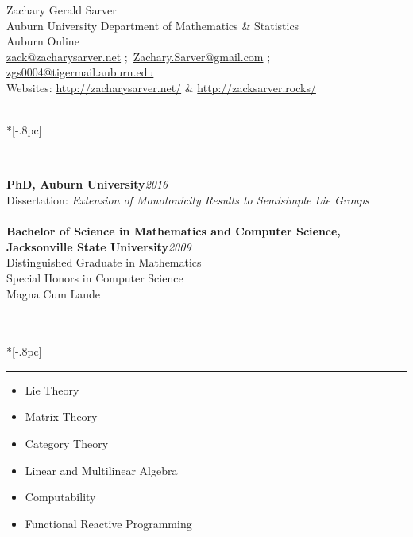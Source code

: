 \documentclass{article}
\begin{document}
\thispagestyle{empty}

\begin{center}
{\Large Zachary Gerald Sarver} \\[.5pc]
Auburn University Department of Mathematics \& Statistics \\
Auburn Online \\
\href{mailto:zack@zacharysarver.net}{zack@zacharysarver.net} $;$
\href{mailto:Zachary.Sarver@gmail.com}{Zachary.Sarver@gmail.com} $;$
\href{mailto:zgs0004@tigermail.auburn.edu}{zgs0004@tigermail.auburn.edu} \\
Websites: \url{http://zacharysarver.net/} \& \url{http://zacksarver.rocks/}
\end{center}

 \\*[-.8pc]
\rule{\textwidth}{.1pt} \\
{\bf PhD, Auburn University}\hfill {\it 2016} \\
Dissertation: \textit{Extension of Monotonicity Results to Semisimple Lie Groups} \\
\\
{\bf Bachelor of Science in Mathematics and Computer Science,\\ Jacksonville State
University}\hfill {\it 2009}\\
Distinguished Graduate in Mathematics\\
Special Honors in Computer Science\\
Magna Cum Laude\\

\

 \\*[-.8pc]
\rule{\textwidth}{.1pt} 
\begin{multicols}{2}
\begin{itemize}[noitemsep]
\item Lie Theory
\item Matrix Theory
\item Category Theory
\item Linear and Multilinear Algebra
\item Computability
\item Functional Reactive Programming
\end{itemize}
\end{multicols}
\end{document}
